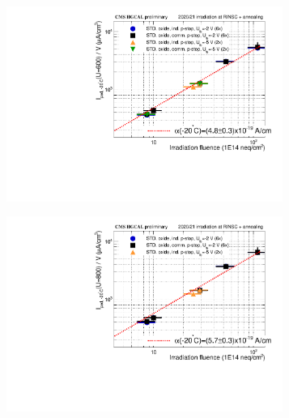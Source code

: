 \begin{figure}
	\captionsetup[subfigure]{aboveskip=-1pt,belowskip=-1pt}
	\centering
	\begin{subfigure}[b]{0.32\textwidth}
		\centering
		\includegraphics[width=0.99\textwidth]{plots/alpha/alpha_600V.pdf}
		\subcaption{
			}
			\label{plot:alpha_600}
	\end{subfigure}
	\hfill
	\begin{subfigure}[b]{0.32\textwidth}
		\centering
		\includegraphics[width=0.99\textwidth]{plots/alpha/alpha_800V.pdf}
		\subcaption{
			}
			\label{plot:alpha_800}
	\end{subfigure}
	\hfill
	\begin{subfigure}[b]{0.32\textwidth}
		\centering

\end{subfigure}
\end{figure}
